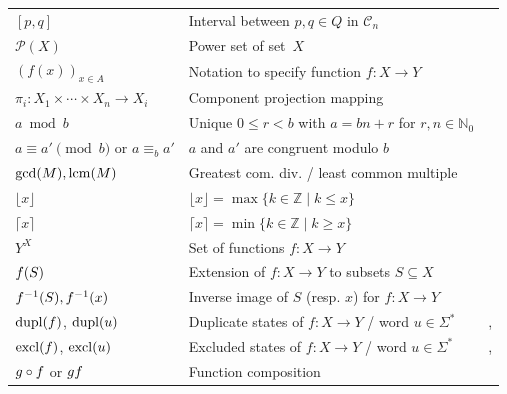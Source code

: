 \begin{longtable}{p{} p{} p{}}
	$[p,q]$ & Interval between $p,q \in Q$ in $\mathcal C_n$ & \pageref{def:interval} \\
	$\mathcal P(X)$ & Power set of set~$X$ & \pageref{def:powerset} \\
	$(f(x))_{x \in A}$ & Notation to specify function $f\colon X \to Y$ & \pageref{def:tuple-notation-function} \\
	$\pi_i \colon X_1 \times \cdots \times X_n \to X_i$            & Component projection mapping & \pageref{def:pi} \\
	$a \bmod b$       & Unique $0 \le r < b$ with $a = bn + r$ for $r,n \in \mathbb N_0$ & \pageref{def:bmod} \\
$a \equiv a' \pmod{b}$ or $a \equiv_b a'$                & $a$ and $a'$ are congruent modulo $b$ & \pageref{def:residue_congruence} \\
	$\gcd(M), \lcm(M)$    & Greatest com. div. / least common multiple & \pageref{def:gcd} \\
	$\lfloor x \rfloor$ & $\lfloor x \rfloor = \max\{ k\in \mathbb Z \mid k \le x\}$ & \pageref{def:floorfn} \\
	$\lceil x \rceil$ & $\lceil x \rceil = \min\{ k\in \mathbb Z \mid k \ge x\}$ & \pageref{def:ceilfn} \\
	$Y^X$ & Set of functions $f \colon X \to Y$ & \pageref{def:BraisedA} \\ 
	$\applyfunc{S}{f}$ & Extension of $f \colon X \to Y$ to subsets $S \subseteq X$ & \pageref{def:f_set_ext} \\
	$\applyfunc{S}{f^{-1}}, \applyfunc{x}{f^{-1}}$ & Inverse image of $S$ (resp. $x$) for $f \colon X \to Y$ & \pageref{def:preimage} \\
	$\dupl{f}$, $\dupl{u}$ & Duplicate states of $f \colon X \to Y$ / word $u \in \Sigma^*$ & \pageref{def:dupl_t}, \pageref{def:exclword} \\	
	$\excl{f}$, $\excl{u}$ & Excluded states of $f \colon X \to Y$ / word $u \in \Sigma^*$ & \pageref{def:excl_t}, \pageref{def:exclword} \\	
	$\concatcirc{f}{g}$ or $\concat{f}{g}$ & Function composition & \pageref{def:fun_comp} \\	

\end{longtable}
